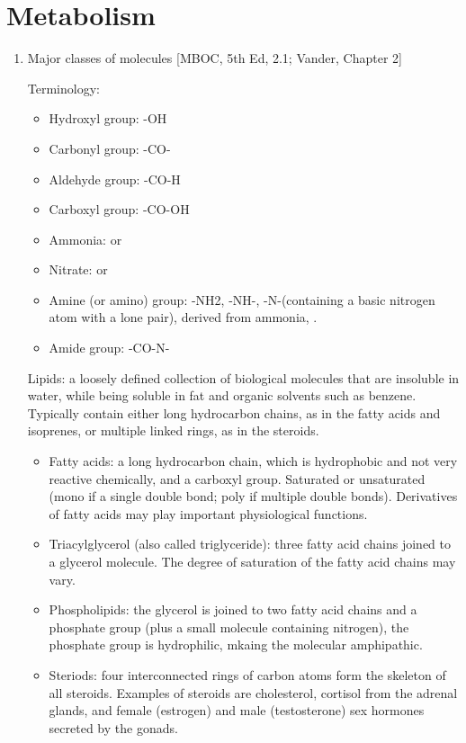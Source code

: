 \documentclass{report}
\begin{document}
\section{Metabolism}
\begin{enumerate}

\item{Major classes of molecules} [MBOC, 5th Ed, 2.1; Vander, Chapter 2]

Terminology: 
\begin{itemize}
	\item Hydroxyl group: -OH
	\item Carbonyl group: -CO-
	\item Aldehyde group: -CO-H
	\item Carboxyl group: -CO-OH
	\item Ammonia:  or 
	\item Nitrate:  or 
	\item Amine (or amino) group: -NH2, -NH-, -N-(containing a basic nitrogen atom with a lone pair), derived from ammonia, . 
	\item Amide group: -CO-N-
\end{itemize}

Lipids: a loosely defined collection of biological molecules that are insoluble in water, while being soluble in fat and organic solvents such as benzene. Typically contain either long hydrocarbon chains, as in the fatty acids and isoprenes, or multiple linked rings, as in the steroids. 
\begin{itemize}
\item Fatty acids: a long hydrocarbon chain, which is hydrophobic and not very reactive chemically, and a carboxyl group. Saturated or unsaturated (mono if a single double bond; poly if multiple double bonds). Derivatives of fatty acids may play important physiological functions. 
\item Triacylglycerol (also called triglyceride): three fatty acid chains joined to a glycerol molecule. The degree of saturation of the fatty acid chains may vary. 
\item Phospholipids: the glycerol is joined to two fatty acid chains and a phosphate group (plus a small molecule containing nitrogen), the phosphate group is hydrophilic, mkaing the molecular amphipathic. 
\item Steriods: four interconnected rings of carbon atoms form the skeleton of all steroids. Examples of steroids are cholesterol, cortisol from the adrenal glands, and female (estrogen) and male (testosterone) sex hormones secreted by the gonads.
\end{itemize}
	

\end{enumerate}
\end{document}
